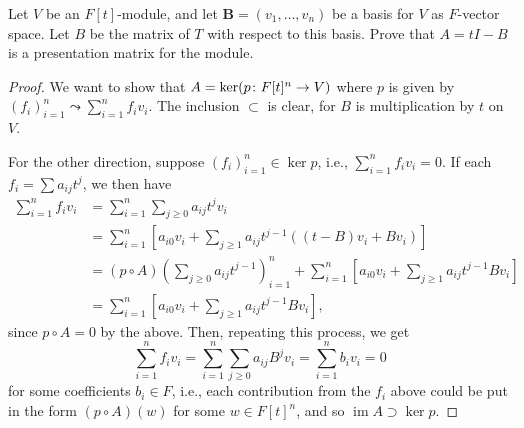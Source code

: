 \documentclass[12pt]{article}
\theoremstyle{remark}
\let\Im\relax
\DeclareMathOperator{\Im}{im}
\begin{document}
\setcounter{subsubsection}{3}
\begin{problem}
  Let $V$ be an $F[t]$-module, and let $\mathbf{B} = (v_1,\ldots,v_n)$ be a basis for $V$ as $F$-vector space. Let $B$ be the matrix of $T$ with respect to this basis. Prove that $A = tI - B$ is a presentation matrix for the module.
\end{problem}
\begin{proof}
  We want to show that $\Im A = \ker (p\colon F[t]^n\to V)$ where $p$ is given by $(f_i)_{i=1}^n \leadsto \sum_{i=1}^n f_iv_i$. The inclusion $\subset$ is clear, for $B$ is multiplication by $t$ on $V$.
  \par For the other direction, suppose $(f_i)_{i=1}^n \in \ker p$, i.e., $\sum_{i=1}^n f_iv_i = 0$. If each $f_i = \sum a_{ij}t^j$, we then have
  \begin{align*}
    \sum_{i=1}^n f_iv_i &= \sum_{i=1}^n \sum_{j\ge0} a_{ij}t^jv_i\\
    &= \sum_{i=1}^n \left[a_{i0}v_i + \sum_{j\ge1} a_{ij}t^{j-1}((t - B)v_i + Bv_i)\right]\\
    &= (p \circ A)\left(\sum_{j\ge0}a_{ij}t^{j-1}\right)_{i=1}^n + \sum_{i=1}^n \left[a_{i0}v_i + \sum_{j\ge1} a_{ij}t^{j-1}Bv_i\right]\\
    &= \sum_{i=1}^n \left[a_{i0}v_i + \sum_{j\ge1} a_{ij}t^{j-1}Bv_i\right],
  \end{align*}
  since $p \circ A = 0$ by the above. Then, repeating this process, we get
  \begin{equation*}
    \sum_{i=1}^n f_iv_i = \sum_{i=1}^n \sum_{j\ge0} a_{ij}B^jv_i = \sum_{i=1}^n b_iv_i = 0
  \end{equation*}
  for some coefficients $b_i \in F$, i.e., each contribution from the $f_i$ above could be put in the form $(p \circ A)(w)$ for some $w \in F[t]^n$, and so $\operatorname{im}A \supset \ker p$.
\end{proof}

\begingroup
\renewcommand{\thesubsection}{\thesection.\Alph{subsection}}
\setcounter{subsection}{12}
\end{document}
